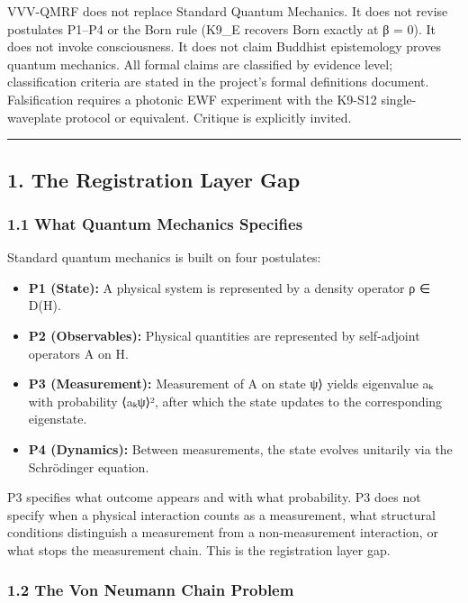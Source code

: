 \documentclass[
  11pt,
]{article}
\providecommand{\tightlist}{%
  \setlength{\itemsep}{0pt}\setlength{\parskip}{0pt}}
\begin{document}
VVV-QMRF does not replace Standard Quantum Mechanics. It does not revise
postulates P1--P4 or the Born rule (K9\_E recovers Born exactly at β =
0). It does not invoke consciousness. It does not claim Buddhist
epistemology proves quantum mechanics. All formal claims are classified
by evidence level; classification criteria are stated in the project's
formal definitions document. Falsification requires a photonic EWF
experiment with the K9-S12 single-waveplate protocol or equivalent.
Critique is explicitly invited.

\begin{center}\rule{0.5\linewidth}{0.5pt}\end{center}

\subsection{1. The Registration Layer
Gap}\label{the-registration-layer-gap}

\subsubsection{1.1 What Quantum Mechanics
Specifies}\label{what-quantum-mechanics-specifies}

Standard quantum mechanics is built on four postulates:

\begin{itemize}
\tightlist
\item
  \textbf{P1 (State):} A physical system is represented by a density
  operator ρ ∈ D(H).
\item
  \textbf{P2 (Observables):} Physical quantities are represented by
  self-adjoint operators A on H.
\item
  \textbf{P3 (Measurement):} Measurement of A on state \textbar ψ⟩
  yields eigenvalue aₖ with probability \textbar⟨aₖ\textbar ψ⟩\textbar²,
  after which the state updates to the corresponding eigenstate.
\item
  \textbf{P4 (Dynamics):} Between measurements, the state evolves
  unitarily via the Schrödinger equation.
\end{itemize}

P3 specifies what outcome appears and with what probability. P3 does not
specify when a physical interaction counts as a measurement, what
structural conditions distinguish a measurement from a non-measurement
interaction, or what stops the measurement chain. This is the
registration layer gap.

\subsubsection{1.2 The Von Neumann Chain
Problem}\label{the-von-neumann-chain-problem}
\end{document}
